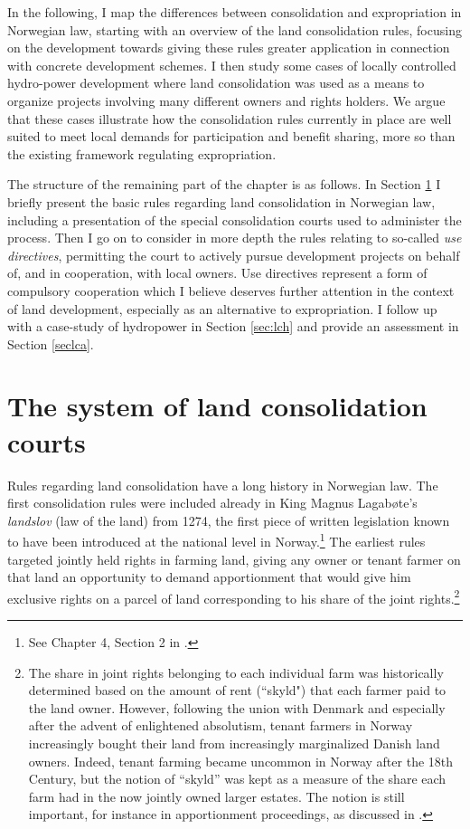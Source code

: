 {In the following, I map the differences between consolidation and expropriation in Norwegian law, starting with an overview of the land consolidation rules, focusing on the development towards giving these rules greater application in connection with concrete development schemes. I then study some cases of locally controlled hydro-power development where land consolidation was used as a means to organize projects involving many different owners and rights holders. We argue that these cases illustrate how the consolidation rules currently in place are well suited to meet local demands for participation and benefit sharing, more so than the existing framework regulating expropriation.

The structure of the remaining part of the chapter is as follows. In Section \ref{sec:lcc} I briefly present the basic rules regarding land consolidation in Norwegian law, including a presentation of the special consolidation courts used to administer the process. Then I go on to consider in more depth the rules relating to so-called \emph{use directives}, permitting the court to actively pursue development projects on behalf of, and in cooperation, with local owners. Use directives represent a form of compulsory cooperation which I believe deserves further attention in the context of land development, especially as an alternative to expropriation. I follow up with a case-study of hydropower in Section \ref{sec:lch} and provide an assessment in Section \ref{seclca}. }

\section{The system of land consolidation courts}\label{sec:lcc}

Rules regarding land consolidation have a long history in Norwegian law. The first consolidation rules were included already in King Magnus Lagabøte's \emph{landslov} (law of the land) from 1274, the first piece of written legislation known to have been introduced at the national level in Norway.\footnote{See Chapter 4, Section 2 in \cite{nou02}.} The earliest rules targeted jointly held rights in farming land, giving any owner or tenant farmer on that land an opportunity to demand apportionment that would give him exclusive rights on a parcel of land corresponding to his share of the joint rights.\footnote{The share in joint rights belonging to each individual farm was historically determined based on the amount of rent (``skyld") that each farmer paid to the land owner. However, following the union with Denmark and especially after the advent of enlightened absolutism, tenant farmers in Norway increasingly bought their land from increasingly marginalized Danish land owners. Indeed, tenant farming became uncommon in Norway after the 18th Century, but the notion of ``skyld'' was kept as a measure of the share each farm had in the now jointly owned larger estates. The notion is still important, for instance in apportionment proceedings, as discussed in  \cite{ravna09a}.}

